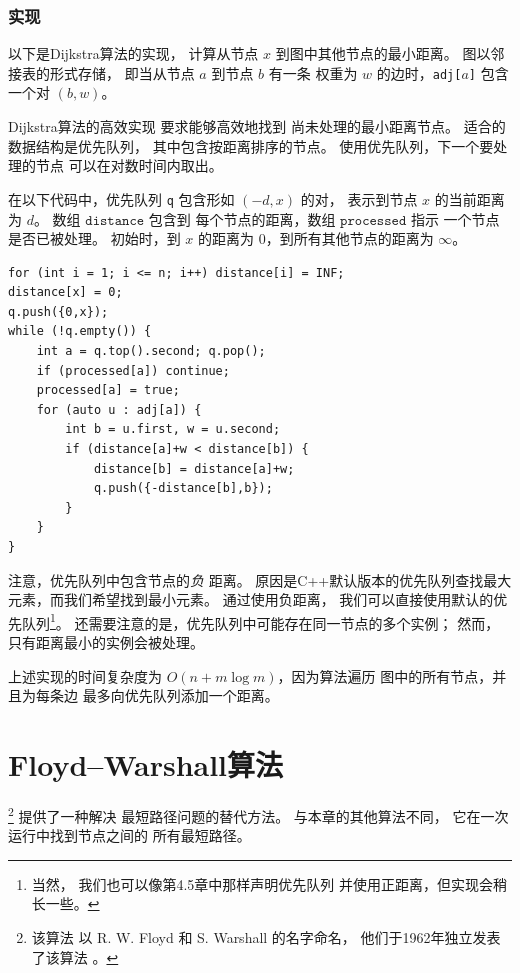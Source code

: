 \subsubsection{实现}

以下是Dijkstra算法的实现，
计算从节点 $x$ 到图中其他节点的最小距离。
图以邻接表的形式存储，
即当从节点 $a$ 到节点 $b$ 有一条
权重为 $w$ 的边时，\texttt{adj[$a$]} 包含一个对 $(b,w)$。

Dijkstra算法的高效实现
要求能够高效地找到
尚未处理的最小距离节点。
适合的数据结构是优先队列，
其中包含按距离排序的节点。
使用优先队列，下一个要处理的节点
可以在对数时间内取出。

在以下代码中，优先队列
\texttt{q} 包含形如 $(-d,x)$ 的对，
表示到节点 $x$ 的当前距离为 $d$。
数组 $\texttt{distance}$ 包含到
每个节点的距离，数组 $\texttt{processed}$ 指示
一个节点是否已被处理。
初始时，到 $x$ 的距离为 $0$，到所有其他节点的距离为 $\infty$。

\begin{lstlisting}
for (int i = 1; i <= n; i++) distance[i] = INF;
distance[x] = 0;
q.push({0,x});
while (!q.empty()) {
    int a = q.top().second; q.pop();
    if (processed[a]) continue;
    processed[a] = true;
    for (auto u : adj[a]) {
        int b = u.first, w = u.second;
        if (distance[a]+w < distance[b]) {
            distance[b] = distance[a]+w;
            q.push({-distance[b],b});
        }
    }
}
\end{lstlisting}

注意，优先队列中包含节点的\emph{负}
距离。
原因是C++默认版本的优先队列查找最大
元素，而我们希望找到最小元素。
通过使用负距离，
我们可以直接使用默认的优先队列\footnote{当然，
我们也可以像第4.5章中那样声明优先队列
并使用正距离，但实现会稍长一些。}。
还需要注意的是，优先队列中可能存在同一节点的多个实例；
然而，只有距离最小的实例会被处理。

上述实现的时间复杂度为
$O(n+m \log m)$，因为算法遍历
图中的所有节点，并且为每条边
最多向优先队列添加一个距离。

\section{Floyd–Warshall算法}


\footnote{该算法
以 R. W. Floyd 和 S. Warshall 的名字命名，
他们于1962年独立发表了该算法 \cite{flo62,war62}。}
提供了一种解决
最短路径问题的替代方法。
与本章的其他算法不同，
它在一次运行中找到节点之间的
所有最短路径。

